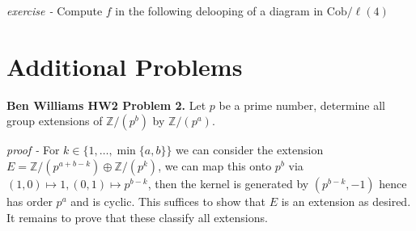 \documentclass[11pt]{article}
\theoremstyle{definition}
\newcommand{\set}[1]{\{#1\}}
\begin{document}
    \emph{exercise - } Compute \(f\) in the following delooping of a diagram in \(\text{Cob}/\ell(4)\)




    



    















    \newpage

    \section{Additional Problems}

    \textbf{Ben Williams HW2 Problem 2.} Let \(p\) be a prime number, determine all group extensions of \(\mathbb{Z}/(p^b)\) by \(\mathbb{Z}/(p^a)\).

    \emph{proof - } For \(k \in \set{1,\hdots,\min\set{a,b}}\) we can consider the extension \(E = \mathbb{Z}/(p^{a + b - k}) \oplus \mathbb{Z}/(p^k)\), we can map this onto \(p^b\) via \((1,0) \mapsto 1, (0,1) \mapsto p^{b-k}\), then the kernel is generated by \((p^{b-k},-1)\) hence has order \(p^a\) and is cyclic. This suffices to show that \(E\) is an extension as desired. It remains to prove that these classify all extensions.
    
\end{document}
